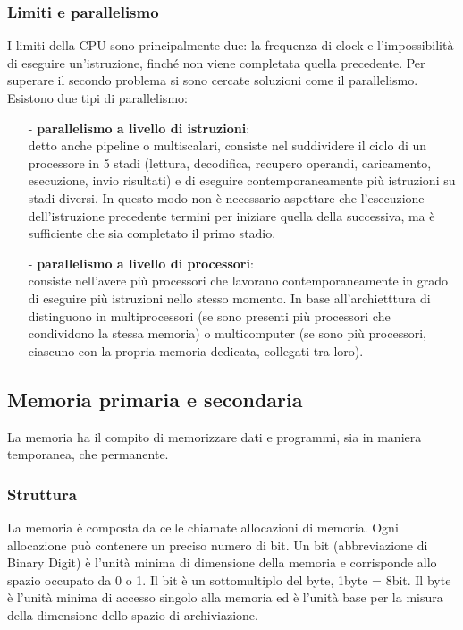 \documentclass[a4paper]{article}
\begin{document}
\subsubsection*{Limiti e parallelismo}
I limiti della CPU sono principalmente due: la frequenza di clock e l'impossibilità di eseguire un'istruzione, finché
non viene completata quella precedente. Per superare il secondo problema si sono cercate soluzioni come il parallelismo.
Esistono due tipi di parallelismo:
\begin{itemize}[topsep=3pt, itemsep=0pt]
	\item[-] \textbf{parallelismo a livello di istruzioni}: \\ 
	detto anche pipeline o multiscalari, consiste nel suddividere il ciclo di un processore in 5 stadi (lettura, decodifica,
	recupero operandi, caricamento, esecuzione, invio risultati) e di eseguire contemporaneamente più istruzioni su stadi
	diversi. In questo modo non è necessario aspettare che l'esecuzione dell'istruzione	precedente termini per iniziare
	quella della successiva, ma è sufficiente che sia completato il primo stadio. 
	\item[-] \textbf{parallelismo a livello di processori}: \\
	consiste nell'avere più processori che lavorano contemporaneamente in grado di eseguire più istruzioni nello stesso momento.
	In base all'archietttura di distinguono in multiprocessori (se sono presenti più processori che condividono la stessa memoria)
	o multicomputer (se sono più processori, ciascuno con la propria memoria dedicata, collegati tra loro).
\end{itemize}

\subsection{Memoria primaria e secondaria}
La memoria ha il compito di memorizzare dati e programmi, sia in maniera temporanea, che permanente.

\subsubsection*{Struttura}
La memoria è composta da celle chiamate allocazioni di memoria. Ogni allocazione può contenere un preciso numero di bit.
Un bit (abbreviazione di Binary Digit) è l'unità minima di dimensione della memoria e corrisponde allo spazio occupato da 0 o 1.
Il bit è un sottomultiplo del byte, 1byte = 8bit. Il byte è l'unità minima di accesso singolo alla memoria ed è l'unità base 
per la misura della dimensione dello spazio di archiviazione.
\end{document}

